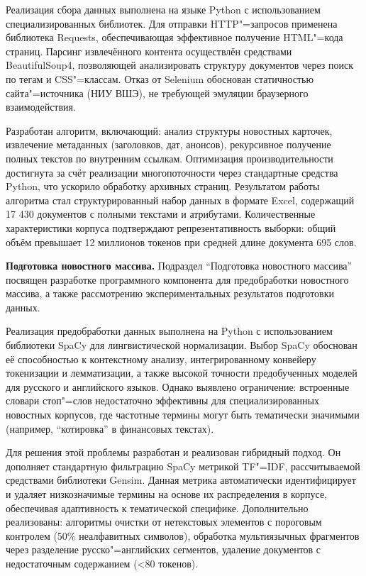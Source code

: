 \documentclass[autoref]{SCWorks}
\begin{document}
Реализация сбора данных выполнена на языке Python с использованием
специализированных библиотек. Для отправки HTTP"=запросов применена библиотека
Requests, обеспечивающая эффективное получение HTML"=кода страниц. Парсинг
извлечённого контента осуществлён средствами BeautifulSoup4, позволяющей
анализировать структуру документов через поиск по тегам и CSS"=классам. Отказ от
Selenium обоснован статичностью сайта"=источника (НИУ ВШЭ), не требующей
эмуляции браузерного взаимодействия.

Разработан алгоритм, включающий: анализ структуры новостных карточек, извлечение
метаданных (заголовков, дат, анонсов), рекурсивное получение полных текстов по
внутренним ссылкам. Оптимизация производительности достигнута за счёт реализации
многопоточности через стандартные средства Python, что ускорило обработку
архивных страниц. Результатом работы алгоритма стал структурированный набор
данных в формате Excel, содержащий 17 430 документов с полными текстами и
атрибутами. Количественные характеристики корпуса подтверждают
репрезентативность выборки: общий объём превышает 12 миллионов токенов при
средней длине документа 695 слов.

\textbf{Подготовка новостного массива.}
Подраздел \enquote{Подготовка новостного массива} посвящен разработке программного
компонента для предобработки новостного массива, а также рассмотрению
экспериментальных результатов подготовки данных. 

Реализация предобработки данных выполнена на Python с использованием библиотеки
SpaCy для лингвистической нормализации. Выбор SpaCy обоснован её способностью к
контекстному анализу, интегрированному конвейеру токенизации и лемматизации, а
также высокой точности предобученных моделей для русского и английского языков.
Однако выявлено ограничение: встроенные словари стоп"=слов недостаточно
эффективны для специализированных новостных корпусов, где частотные термины
могут быть тематически значимыми (например, \enquote{котировка} в финансовых
текстах).

Для решения этой проблемы разработан и реализован гибридный подход. Он дополняет
стандартную фильтрацию SpaCy метрикой TF"=IDF, рассчитываемой средствами
библиотеки Gensim. Данная метрика автоматически идентифицирует и удаляет
низкозначимые термины на основе их распределения в корпусе, обеспечивая
адаптивность к тематической специфике. Дополнительно реализованы: алгоритмы
очистки от нетекстовых элементов с пороговым контролем (50\% неалфавитных
символов), обработка мультиязычных фрагментов через разделение
русско"=английских сегментов, удаление документов с недостаточным содержанием
(<80 токенов).
\end{document}
